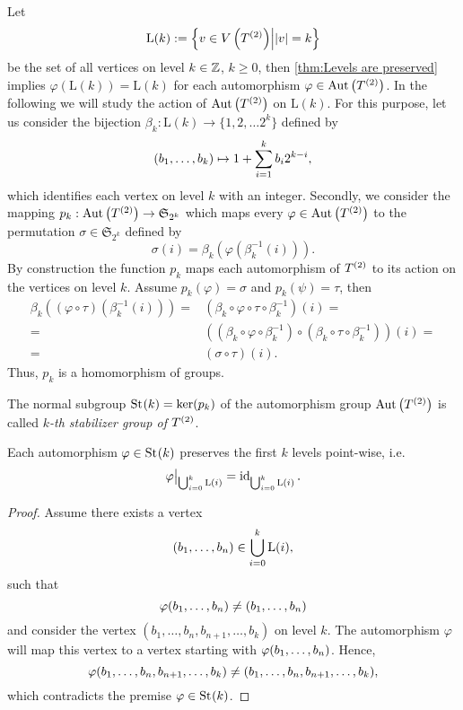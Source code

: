 Let
\begin{equation*}
\mathrm{L}(k):=\left\lbrace v\in\VT\middle\vert \lvert v\rvert=k\right\rbrace
\end{equation*}
be the set of all vertices on level $k\in\Z$, $k\geq 0$,  then \cref{thm:Levels are preserved} implies $\varphi(\mathrm{L}(k))=\mathrm{L}(k)$ for each automorphism $\varphi\in\AutT$. In the following we will study the action of $\AutT$ on $\mathrm{L}(k)$. For this purpose, let us consider the bijection $\beta_k\colon\mathrm{L}(k)\to\lbrace 1,2,\ldots 2^k\rbrace$ defined by 
\begin{equation*}
(\seq[k]{b})\mapsto 1+\sum_{i=1}^{k} b_i2^{k-i},
\end{equation*}
which identifies each vertex on level $k$ with an integer. Secondly, we consider the mapping $p_k:\AutT\to\mathfrak{S}_{2^k}$ which maps every $\varphi\in\AutT$ to the permutation $\sigma\in\mathfrak{S}_{2^k}$ defined by
\begin{equation*}
\sigma(i)=\beta_k(\varphi(\beta_k^{-1}(i))).
\end{equation*}
By construction the function $p_k$ maps each automorphism of $\T$ to its action on the vertices on level $k$. Assume $p_k(\varphi)=\sigma$ and $p_k(\psi)=\tau$, then
\begin{align*}
\beta_k((\varphi\circ\tau)(\beta_k^{-1}(i)))=&(\beta_k\circ\varphi\circ\tau\circ \beta_k^{-1})(i)=\\
=&((\beta_k\circ\varphi\circ \beta_k^{-1})\circ(\beta_k\circ\tau\circ \beta_k^{-1}))(i)=\\
=&(\sigma\circ\tau)(i).
\end{align*}
Thus, $p_k$ is a homomorphism of groups.

\begin{defin}\label{def:Stabilizer Group}
The normal subgroup $\St{k}=\ker(p_k)$ of the automorphism group $\AutT$ is called \textit{$k$-th stabilizer group of $\T$}.
\end{defin}

\begin{pro}
Each automorphism $\varphi\in\St{k}$ preserves the first $k$ levels point-wise, i.e.
\begin{equation*}
\varphi\big\vert_{\bigcup_{i=0}^k\mathrm{L}(i)}=\id_{\bigcup_{i=0}^k\mathrm{L}(i)}.
\end{equation*}
\end{pro}
\begin{proof}
Assume there exists a vertex 
\begin{equation*}
(\seq{b})\in\bigcup_{i=0}^k\mathrm{L}(i),
\end{equation*}
such that 
\begin{equation*}
\varphi(\seq{b})\neq (\seq{b})
\end{equation*}
and consider the vertex $(b_1,\ldots,b_n,b_{n+1},\ldots,b_k)$ on level $k$. The automorphism $\varphi$ will map this vertex to a vertex starting with $\varphi(\seq{b})$. Hence, 
\begin{equation*}
\varphi(\seq{b},b_{n+1},\ldots,b_k)\neq(b_1,\ldots,b_n,b_{n+1},\ldots,b_k),
\end{equation*}
which contradicts the premise $\varphi\in\St{k}$. 
\end{proof}